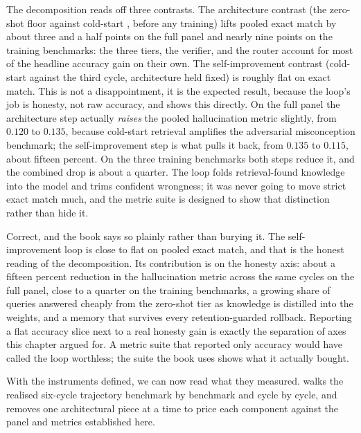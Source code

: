 \begin{precise}
The decomposition reads off three contrasts. The architecture contrast (the
zero-shot floor against cold-start \caem{}, before any training) lifts pooled exact
match by about three and a half points on the full panel and nearly nine points on
the training benchmarks: the three tiers, the verifier, and the router account for
most of the headline accuracy gain on their own. The self-improvement contrast
(cold-start \caem{} against the third cycle, architecture held fixed) is roughly flat
on exact match. This is not a disappointment, it is the expected result, because the
loop's job is honesty, not raw accuracy, and  shows this
directly. On the full panel the architecture step actually \emph{raises} the pooled
hallucination metric slightly, from $0.120$ to $0.135$, because cold-start retrieval
amplifies the adversarial misconception benchmark; the self-improvement step is what
pulls it back, from $0.135$ to $0.115$, about fifteen percent. On the three training
benchmarks both steps reduce it, and the combined drop is about a quarter. The loop
folds retrieval-found knowledge into the model and trims confident wrongness; it was
never
going to move strict exact match much, and the metric suite is designed to show that
distinction rather than hide it.
\end{precise}

\begin{defence}
Correct, and the book says so plainly rather than burying it. The self-improvement
loop is close to flat on pooled exact match, and that is the honest reading of the
decomposition. Its contribution is on the honesty axis: about a fifteen percent
reduction in the hallucination metric across the same cycles on the full panel, close
to a quarter on the training benchmarks, a growing share of
queries answered cheaply from the zero-shot tier as knowledge is distilled into the
weights, and a memory that survives every retention-guarded rollback. Reporting a
flat accuracy slice next to a real honesty gain is exactly the separation of axes
this chapter argued for. A metric suite that reported only accuracy would have called
the loop worthless; the suite the book uses shows what it actually bought.
\end{defence}

With the instruments defined, we can now read what they measured. 
walks the realised six-cycle trajectory benchmark by benchmark and cycle by cycle, and
 removes one architectural piece at a time to price each component
against the panel and metrics established here.
